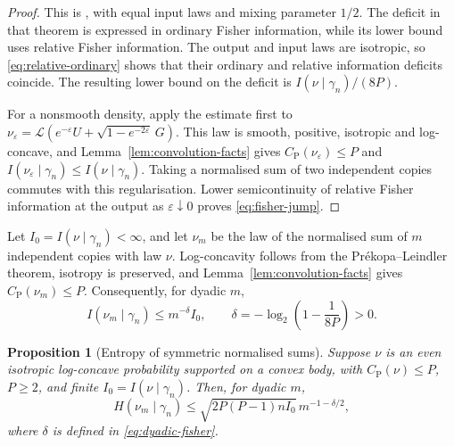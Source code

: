 \documentclass[11pt]{amsart}
\numberwithin{equation}{section}
\newtheorem{proposition}[theorem]{Proposition}
\theoremstyle{definition}
\theoremstyle{remark}
\newcommand{\gam}{\gamma_n}
\newcommand{\CP}{C_{\mathrm P}}
\newcommand{\eps}{\varepsilon}
\begin{document}
\begin{proof}
This is \cite[Theorem~2]{Biz23}, with equal input laws and mixing
parameter \(1/2\). The deficit in that theorem is expressed in ordinary
Fisher information, while its lower bound uses relative Fisher
information. The output and input laws are isotropic, so
\eqref{eq:relative-ordinary} shows that their ordinary and relative
information deficits coincide. The resulting lower bound on the
deficit is \(I(\nu\mid\gam)/(8P)\).

For a nonsmooth density, apply the estimate first to
\(\nu_\eps=\mathcal L(e^{-\eps}U+\sqrt{1-e^{-2\eps}}\,G)\).
This law is smooth, positive, isotropic and log-concave, and
Lemma~\ref{lem:convolution-facts} gives
\(\CP(\nu_\eps)\le P\) and
\(I(\nu_\eps\mid\gam)\le I(\nu\mid\gam)\).
Taking a normalised sum of two independent copies commutes with this
regularisation. Lower semicontinuity of relative Fisher information at
the output as \(\eps\downarrow0\) proves \eqref{eq:fisher-jump}.
\end{proof}

Let \(I_0=I(\nu\mid\gam)<\infty\), and let \(\nu_m\) be the law of
the normalised sum of \(m\) independent copies with law \(\nu\).
Log-concavity follows
from the Pr\'ekopa--Leindler theorem, isotropy is preserved, and
Lemma~\ref{lem:convolution-facts} gives \(\CP(\nu_m)\le P\).
Consequently, for dyadic \(m\),
\begin{equation}\label{eq:dyadic-fisher}
I(\nu_m\mid\gam)\le m^{-\delta}I_0,
\qquad
\delta=-\log_2\left(1-\frac1{8P}\right)>0.
\end{equation}

\begin{proposition}[Entropy of symmetric normalised sums]
\label{prop:entropy-clt}
Suppose \(\nu\) is an even isotropic log-concave probability supported
on a convex body, with \(\CP(\nu)\le P\), \(P\ge2\), and finite
\(I_0=I(\nu\mid\gam)\). Then, for dyadic \(m\),
\begin{equation}\label{eq:entropy-clt}
H(\nu_m\mid\gam)
\le \sqrt{2P(P-1)n I_0}\,m^{-1-\delta/2},
\end{equation}
where \(\delta\) is defined in \eqref{eq:dyadic-fisher}.
\end{proposition}
\end{document}
